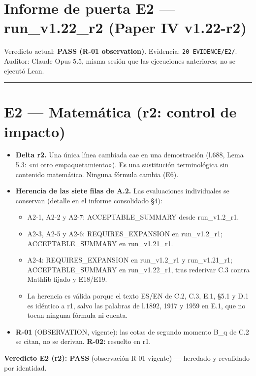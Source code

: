 \documentclass[
]{article}
\author{}
\date{}
\providecommand{\tightlist}{%
  \setlength{\itemsep}{0pt}\setlength{\parskip}{0pt}}
\begin{document}
\section{Informe de puerta E2 --- run\_v1.22\_r2 (Paper IV
v1.22-r2)}\label{informe-de-puerta-e2--run_v122_r2-paper-iv-v122-r2}

Veredicto actual: \textbf{PASS (R-01 observation)}. Evidencia:
\texttt{20\_EVIDENCE/E2/}. Auditor: Claude Opus 5.5, misma sesión que
las ejecuciones anteriores; no se ejecutó Lean.

\begin{center}\rule{0.5\linewidth}{0.5pt}\end{center}

\section{E2 --- Matemática (r2: control de
impacto)}\label{e2--matemuxe1tica-r2-control-de-impacto}

\begin{itemize}
\tightlist
\item
  \textbf{Delta r2.} Una única línea cambiada cae en una demostración
  (l.688, Lema 5.3: «ni otro empaquetamiento»). Es una sustitución
  terminológica sin contenido matemático. Ninguna fórmula cambia (E6).
\item
  \textbf{Herencia de las siete filas de A.2.} Las evaluaciones
  individuales se conservan (detalle en el informe consolidado §4):

  \begin{itemize}
  \tightlist
  \item
    A2-1, A2-2 y A2-7: ACCEPTABLE\_SUMMARY desde run\_v1.2\_r1.
  \item
    A2-3, A2-5 y A2-6: REQUIRES\_EXPANSION en run\_v1.2\_r1;
    ACCEPTABLE\_SUMMARY en run\_v1.21\_r1.
  \item
    A2-4: REQUIRES\_EXPANSION en run\_v1.2\_r1 y run\_v1.21\_r1;
    ACCEPTABLE\_SUMMARY en run\_v1.22\_r1, tras rederivar C.3 contra
    Mathlib fijado y E18/E19.
  \item
    La herencia es válida porque el texto ES/EN de C.2, C.3, E.1, §5.1 y
    D.1 es idéntico a r1, salvo las palabras de l.1892, 1917 y 1959 en
    E.1, que no tocan ninguna fórmula ni cuenta.
  \end{itemize}
\item
  \textbf{R-01} (OBSERVATION, vigente): las cotas de segundo momento
  B\_q de C.2 se citan, no se derivan. \textbf{R-02:} resuelto en r1.
\end{itemize}

\textbf{Veredicto E2 (r2): PASS} (observación R-01 vigente) --- heredado
y revalidado por identidad.
\end{document}
